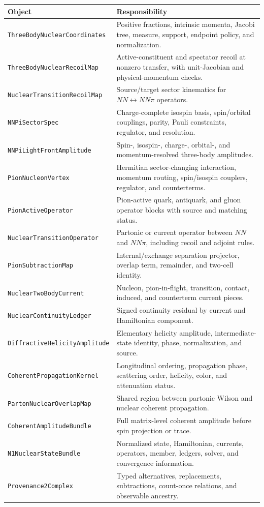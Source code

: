 \documentclass[11pt]{article}
\newcommand{\StateBundle}{\texttt{N1NuclearStateBundle}}
\newcommand{\PionSector}{\texttt{NNPiSectorSpec}}
\newcommand{\ThreeBodyRecoil}{\texttt{ThreeBodyNuclearRecoilMap}}
\newcommand{\TransitionRecoil}{\texttt{NuclearTransitionRecoilMap}}
\newcommand{\PionOperator}{\texttt{PionActiveOperator}}
\newcommand{\TransitionOperator}{\texttt{NuclearTransitionOperator}}
\newcommand{\PionSubtraction}{\texttt{PionSubtractionMap}}
\newcommand{\TwoBodyCurrent}{\texttt{NuclearTwoBodyCurrent}}
\newcommand{\ContinuityLedger}{\texttt{NuclearContinuityLedger}}
\newcommand{\CoherentKernel}{\texttt{CoherentPropagationKernel}}
\newcommand{\CoherentBundle}{\texttt{CoherentAmplitudeBundle}}
\newcommand{\OverlapMap}{\texttt{PartonNuclearOverlapMap}}
\newcommand{\ProvComplex}{\texttt{Provenance2Complex}}
\begin{document}
\begin{longtable}{L{0.34\textwidth}L{0.58\textwidth}}
\toprule
Object & Responsibility\\
\midrule
\endhead
\texttt{ThreeBodyNuclearCoordinates} & Positive fractions, intrinsic momenta,
Jacobi tree, measure, support, endpoint policy, and normalization.\\
\ThreeBodyRecoil & Active-constituent and spectator recoil at nonzero transfer,
with unit-Jacobian and physical-momentum checks.\\
\TransitionRecoil & Source/target sector kinematics for
\(NN\leftrightarrow NN\pi\) operators.\\
\PionSector & Charge-complete isospin basis, spin/orbital couplings, parity,
Pauli constraints, regulator, and resolution.\\
\texttt{NNPiLightFrontAmplitude} & Spin-, isospin-, charge-, orbital-, and
momentum-resolved three-body amplitudes.\\
\texttt{PionNucleonVertex} & Hermitian sector-changing interaction, momentum
routing, spin/isospin couplers, regulator, and counterterms.\\
\PionOperator & Pion-active quark, antiquark, and gluon operator blocks with
source and matching status.\\
\TransitionOperator & Partonic or current operator between \(NN\) and
\(NN\pi\), including recoil and adjoint rules.\\
\PionSubtraction & Internal/exchange separation projector, overlap term,
remainder, and two-cell identity.\\
\TwoBodyCurrent & Nucleon, pion-in-flight, transition, contact, induced, and
counterterm current pieces.\\
\ContinuityLedger & Signed continuity residual by current and Hamiltonian
component.\\
\texttt{DiffractiveHelicityAmplitude} & Elementary helicity amplitude,
intermediate-state identity, phase, normalization, and source.\\
\CoherentKernel & Longitudinal ordering, propagation phase, scattering order,
helicity, color, and attenuation status.\\
\OverlapMap & Shared region between partonic Wilson and nuclear coherent
propagation.\\
\CoherentBundle & Full matrix-level coherent amplitude before spin projection
or trace.\\
\StateBundle & Normalized state, Hamiltonian, currents, operators, member,
ledgers, solver, and convergence information.\\
\ProvComplex & Typed alternatives, replacements, subtractions, count-once
relations, and observable ancestry.\\
\bottomrule
\end{longtable}
\end{document}
